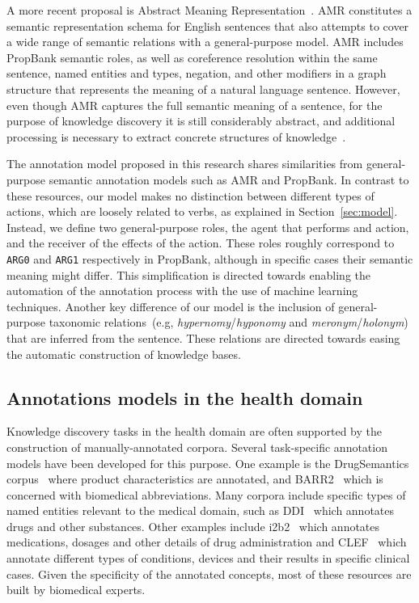  A more recent proposal is Abstract Meaning Representation~\cite[ARM]{amr}. AMR constitutes a semantic representation schema for English sentences that also attempts to cover a wide range of semantic relations with a general-purpose model.
  AMR includes PropBank semantic roles, as well as coreference resolution within the same sentence, named entities and types, negation, and other modifiers in a graph structure that represents the meaning of a natural language sentence.
  However, even though AMR captures the full semantic meaning of a sentence, for the purpose of knowledge discovery it is still considerably abstract, and additional processing is necessary to extract concrete structures of knowledge~\cite{rao2017biomedical}.

  The annotation model proposed in this research shares similarities from general-purpose semantic annotation models such as AMR and PropBank.
  In contrast to these resources, our model makes no distinction between different types of actions, which are loosely related to verbs, as explained in Section~\ref{sec:model}. Instead, we define two general-purpose roles, the agent that performs and action, and the receiver of the effects of the action. These roles roughly correspond to \texttt{ARG0} and \texttt{ARG1} respectively in PropBank, although in specific cases their semantic meaning might differ.
  This simplification is directed towards enabling the automation of the annotation process with the use of machine learning techniques.
  Another key difference of our model is the inclusion of general-purpose taxonomic relations~(e.g, \textit{hypernomy}/\textit{hyponomy} and \textit{meronym}/\textit{holonym}) that are inferred from the sentence. These relations are directed towards easing the automatic construction of knowledge bases.

  \subsection{Annotations models in the health domain}\label{sec:health}

  Knowledge discovery tasks in the health domain are often supported by the construction of manually-annotated corpora.
  Several task-specific annotation models have been developed for this purpose. One example is the  {DrugSemantics} corpus~\cite{moreno2017drugsemantics} where product characteristics are annotated, and  {BARR2}~\cite{barr2} which is concerned with biomedical abbreviations.
  Many corpora include specific types of named entities relevant to the medical domain, such as {DDI}~\cite{ddi} which annotates drugs and other substances.
  Other examples include {i2b2}~\cite{i2b2} which annotates medications, dosages and other details of drug administration and  {CLEF}~\cite{clef} which annotate different types of conditions, devices and their results in specific clinical cases.
  Given the specificity of the annotated concepts, most of these resources are built by biomedical experts.


